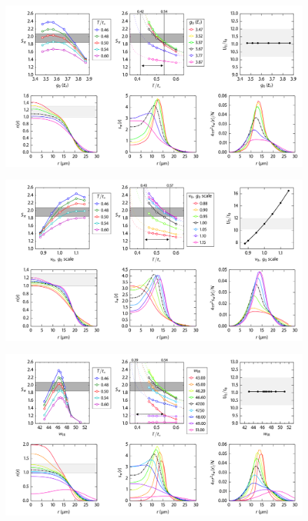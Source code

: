 \documentclass[11pt,letter]{article}
\begin{document}
\begin{figure}[H]
    \centering \includegraphics[width=\textwidth]{figures/02_CompDepth.png}
\caption{ }
\label{fig:02}
\end{figure}

\begin{figure}[H]
    \centering \includegraphics[width=\textwidth]{figures/03_Lattice+Comp.png}
\caption{ }
\label{fig:03}
\end{figure}

\begin{figure}[H]
    \centering \includegraphics[width=\textwidth]{figures/04_wIR.png}
\caption{ }
\label{fig:04}
\end{figure}
\end{document}
